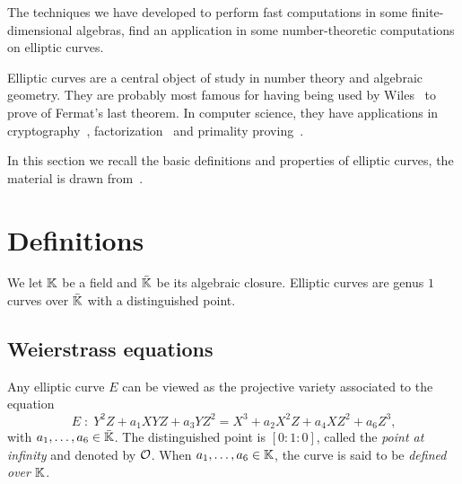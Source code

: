 

The techniques we have developed to perform fast computations in some
finite-dimensional algebras, find an application in some
number-theoretic computations on elliptic curves.

Elliptic curves are a central object of study in number theory and
algebraic geometry. They are probably most famous for having being
used by Wiles~\cite{wiles95,wiles+taylor95} to prove of Fermat's last
theorem. In computer science, they have applications in
cryptography~\cite{koblitz87,miller86,blake+seroussi+smart},
factorization~\cite{lenstra87,atkin+morain93,bernstein+birkner+lange+peters08-2}
and primality proving~\cite{atkin+morain93:2,morain07}.

In this section we recall the basic definitions and properties of
elliptic curves, the material is drawn
from~\cite{silverman:elliptic,milne1996elliptic,connell:elliptic}.


\section{Definitions}
\label{sec:definitions}

We let $\mathbb{K}$ be a field and $\bar{\mathbb{K}}$ be its algebraic
closure. Elliptic curves are genus $1$ curves
over $\bar{\mathbb{K}}$ with a distinguished point.

\subsection{Weierstrass equations}
\label{sec:weierstr-equat}

\begin{definition}
   Any elliptic curve $E$ can be viewed as
  the projective variety associated to the equation
  \begin{equation}
    \label{eq:107}
    E\;:\; Y^2Z + a_1XYZ + a_3YZ^2 = X^3 + a_2X^2Z + a_4XZ^2 + a_6Z^3
    \text{,}
  \end{equation}
  with $a_1,\ldots,a_6\in\bar{\mathbb{K}}$.  The distinguished point is
  $[0:1:0]$, called the \emph{point at
    infinity} and denoted by $\mathcal{O}$.  When $a_1,\ldots,a_6\in\mathbb{K}$, the
  curve is said to be \emph{defined over $\mathbb{K}$}.
\end{definition}

